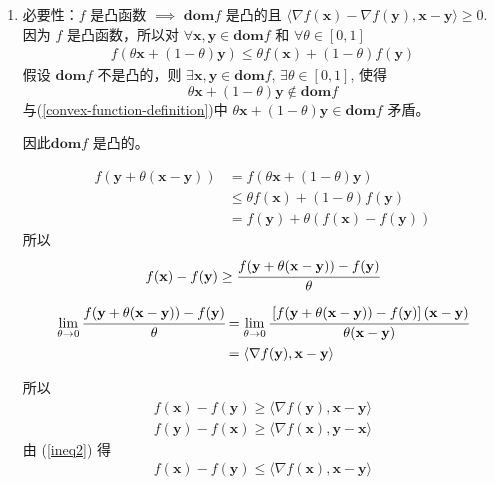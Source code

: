 \documentclass[11pt,letter,notitlepage]{article}
\newcommand{\dom}{ \textbf{dom}  }
\begin{document}
\begin{solution}
	\begin{enumerate}
		\item 必要性：$f$ 是凸函数 $\implies$ $\dom f$ 是凸的且 $\langle \nabla f(\mathbf{x}) - \nabla f(\mathbf{y}) , \mathbf{x} - \mathbf{y} \rangle \geq 0$.
		      因为 $f$ 是凸函数，所以对 $\forall \mathbf{x},\mathbf{y} \in \dom f$ 和 $\forall \theta \in [0,1]$
		      \begin{align}\label{convex-function-definition}
			      f(\theta\mathbf{x}+(1-\theta)\mathbf{y})\le\theta f(\mathbf{x})+(1-\theta)f(\mathbf{y})
		      \end{align}
		      假设 $\dom f$ 不是凸的，则 $\exists \mathbf{x},\mathbf{y} \in \dom f$, $\exists \theta \in [0,1]$, 使得
		      $$\theta\mathbf{x}+(1-\theta)\mathbf{y} \notin \dom f$$
		      与(\ref{convex-function-definition})中 $\theta\mathbf{x}+(1-\theta)\mathbf{y} \in \dom f$ 矛盾。

		      因此$\dom f$ 是凸的。

		      $$\begin{aligned}
				      f(\mathbf{y}+\theta(\mathbf{x}-\mathbf{y}))
				       & = f(\theta\mathbf{x}+(1-\theta)\mathbf{y})          \\
				       & \le \theta f(\mathbf{x})+(1-\theta)f(\mathbf{y})    \\
				       & = f(\mathbf{y})+\theta(f(\mathbf{x})-f(\mathbf{y}))
			      \end{aligned}$$
		      所以
		      $$f(\mathbf{x})-f(\mathbf{y})
			      \ge \cfrac{f(\mathbf{y}+\theta(\mathbf{x}-\mathbf{y}))-f(\mathbf{y})}{\theta} $$

		      $$\begin{aligned}
				      \lim_{\theta\to 0}{\cfrac{f(\mathbf{y}+\theta(\mathbf{x}-\mathbf{y}))-f(\mathbf{y})}{\theta}}
				       & = \lim_{\theta\to 0}{
					      \cfrac{\left[f(\mathbf{y}+\theta(\mathbf{x}-\mathbf{y}))-f(\mathbf{y})\right](\mathbf{x}-\mathbf{y})}{\theta (\mathbf{x}-\mathbf{y})}
				      }                                                                \\
				       & = \langle \nabla f(\mathbf{y}), \mathbf{x}-\mathbf{y} \rangle
			      \end{aligned}$$

		      所以
		      \begin{align}\label{ineq1}
			      f(\mathbf{x})-f(\mathbf{y}) \ge \langle \nabla f(\mathbf{y}), \mathbf{x}-\mathbf{y} \rangle
		      \end{align}
		      \begin{align}\label{ineq2}
			      f(\mathbf{y})-f(\mathbf{x}) \ge \langle \nabla f(\mathbf{x}), \mathbf{y}-\mathbf{x} \rangle
		      \end{align}
		      由 (\ref{ineq2}) 得
		      \begin{align}\label{ineq3}
			      f(\mathbf{x})-f(\mathbf{y}) \le \langle \nabla f(\mathbf{x}), \mathbf{x}-\mathbf{y} \rangle
		      \end{align}


\end{enumerate}
\end{solution}
\end{document}
